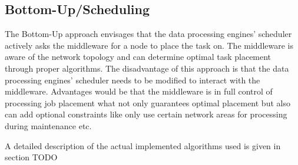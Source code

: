 \subsection{Bottom-Up/Scheduling}
The Bottom-Up approach envisages that the data processing engines’ scheduler actively asks the
middleware for a node to place the task on. The middleware is aware of the network topology and can
determine optimal task placement through proper algorithms. The disadvantage of this approach is
that the data processing engines’ scheduler needs to be modified to interact with the middleware.
Advantages would be that the middleware is in full control of processing job placement what not only
guarantees optimal placement but also can add optional constraints like only use certain network
areas for processing during maintenance etc. 

A detailed description of the actual implemented algorithms used is given in section TODO
